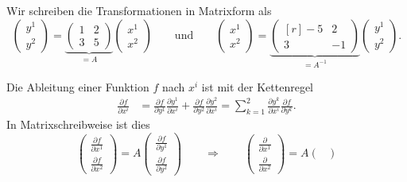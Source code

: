 \begin{loesung}
Wir schreiben die Transformationen in Matrixform als
\[
\begin{pmatrix}
y^1\\y^2
\end{pmatrix}
=
\underbrace{
\begin{pmatrix}
1&2\\ 3&5
\end{pmatrix}
}_{\displaystyle = A}
\begin{pmatrix}
x^1\\x^2
\end{pmatrix}
\qquad\text{und}\qquad
\begin{pmatrix}
x^1\\x^2
\end{pmatrix}
=
\underbrace{
\begin{pmatrix*}[r]
-5&2\\ 3&-1
\end{pmatrix*}
}_{\displaystyle = A^{-1}}
\begin{pmatrix}
y^1\\y^2
\end{pmatrix}.
\]
\begin{teilaufgaben}
\item Die Ableitung einer Funktion $f$ nach $x^i$ ist mit der
Kettenregel
\begin{align*}
\frac{\partial f}{\partial x^i}
&=
\frac{\partial f}{\partial y^1}\frac{\partial y^1}{\partial x^i}
+
\frac{\partial f}{\partial y^2}\frac{\partial y^2}{\partial x^i}
=
\sum_{k=1}^2
\frac{\partial y^k}{\partial x^i}
\frac{\partial f}{\partial y^k}.
\end{align*}
In Matrixschreibweise ist dies
\begin{equation}
\renewcommand{\arraystretch}{1.8}
\begin{pmatrix}
\displaystyle \frac{\partial f}{\partial x^1}\\
\displaystyle \frac{\partial f}{\partial x^2}
\end{pmatrix}
=
A
\begin{pmatrix}
\displaystyle \frac{\partial f}{\partial y^1}\\
\displaystyle \frac{\partial f}{\partial y^2}
\end{pmatrix}
\qquad\Rightarrow\qquad
\begin{pmatrix}
\displaystyle \frac{\partial }{\partial x^1}\\
\displaystyle \frac{\partial }{\partial x^2}
\end{pmatrix}
=
A
\begin{pmatrix}

\end{pmatrix}
\end{equation}
\end{teilaufgaben}
\end{loesung}
